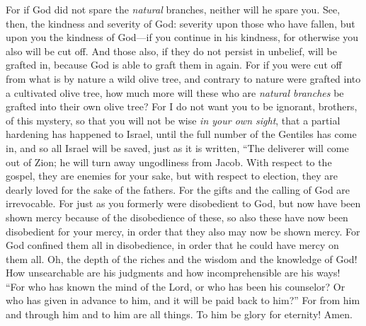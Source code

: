 \begin{biblechapter}
\verse For if God did not spare the \textit{natural} branches, neither will he spare you.
\verse See, then, the kindness and severity of God: severity upon those who have fallen, but upon you the kindness of God—if you continue in his kindness, for otherwise you also will be cut off.
\verse And those also, if they do not persist in unbelief, will be grafted in, because God is able to graft them in again.
\verse For if you were cut off from what is by nature a wild olive tree, and contrary to nature were grafted into a cultivated olive tree, how much more will these who are \textit{natural branches} be grafted into their own olive tree?
 For I do not want you to be ignorant, brothers, of this mystery, so that you will not be wise \textit{in your own sight}, that a partial hardening has happened to Israel, until the full number of the Gentiles has come in,
\verse and so all Israel will be saved, just as it is written,
\verse “The deliverer will come out of Zion; 
he will turn away ungodliness from Jacob.
\verse With respect to the gospel, they are enemies for your sake, but with respect to election, they are dearly loved for the sake of the fathers.
\verse For the gifts and the calling of God are irrevocable.
\verse For just as you formerly were disobedient to God, but now have been shown mercy because of the disobedience of these,
\verse so also these have now been disobedient for your mercy, in order that they also may now be shown mercy.
\verse For God confined them all in disobedience, in order that he could have mercy on them all.
\verse Oh, the depth of the riches 
and the wisdom and the knowledge of God! 
How unsearchable are his judgments 
and how incomprehensible are his ways!
\verse “For who has known the mind of the Lord, 
or who has been his counselor?
\verse Or who has given in advance to him, 
and it will be paid back to him?”
\verse For from him and through him and to him are all things. 
To him be glory for eternity! Amen.
\end{biblechapter}


